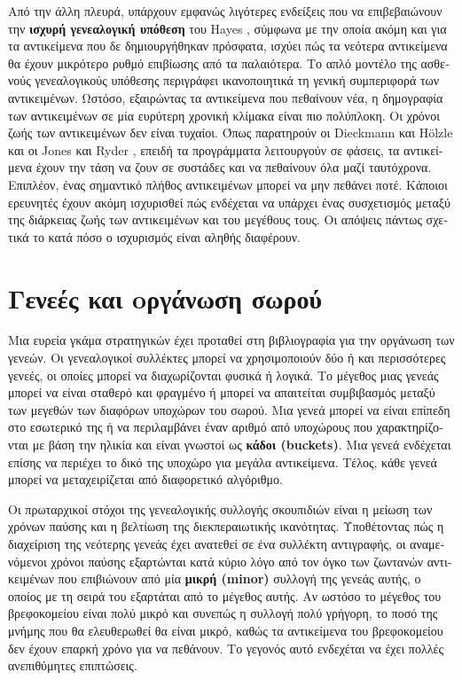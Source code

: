 \begin{greek}
Από την άλλη πλευρά, υπάρχουν εμφανώς λιγότερες ενδείξεις
που να επιβεβαιώνουν την \textbf{ισχυρή γενεαλογική υπόθεση}
του Hayes \cite{DBLP:conf/oopsla/Hayes91}, σύμφωνα με την
οποία ακόμη και για τα αντικείμενα που δε δημιουργήθηκαν
πρόσφατα, ισχύει πώς τα νεότερα αντικείμενα θα έχουν μικρότερο
ρυθμό επιβίωσης από τα παλαιότερα. Το απλό μοντέλο της ασθενούς
γενεαλογικούς υπόθεσης περιγράφει ικανοποιητικά τη γενική
συμπεριφορά των αντικειμένων. Ωστόσο, εξαιρώντας τα αντικείμενα
που πεθαίνουν νέα, η δημογραφία των αντικειμένων σε μία
ευρύτερη χρονική κλίμακα είναι πιο πολύπλοκη. Οι χρόνοι
ζωής των αντικειμένων δεν είναι τυχαίοι. Όπως παρατηρούν
οι Dieckmann και H{\"o}lzle \cite{DBLP:conf/ecoop/DieckmannH99}
και οι Jones και Ryder \cite{DBLP:conf/iwmm/JonesR08}, επειδή
τα προγράμματα λειτουργούν σε φάσεις, τα αντικείμενα έχουν
την τάση να ζουν σε συστάδες και να πεθαίνουν όλα μαζί
ταυτόχρονα. Επιπλέον, ένας σημαντικό πλήθος αντικειμένων μπορεί
να μην πεθάνει ποτέ. Κάποιοι ερευνητές έχουν ακόμη ισχυρισθεί
πώς ενδέχεται να υπάρχει ένας συσχετισμός μεταξύ της διάρκειας
ζωής των αντικειμένων και του μεγέθους τους. Οι απόψεις πάντως
\cite{DBLP:conf/oopsla/CaudillW86, DBLP:conf/oopsla/UngarJ88,
DBLP:conf/pldi/BarrettZ93} σχετικά το κατά πόσο ο ισχυρισμός
είναι αληθής διαφέρουν.

\section{Γενεές και oργάνωση σωρού}
Μια ευρεία γκάμα στρατηγικών έχει προταθεί στη βιβλιογραφία για την οργάνωση των
γενεών. Οι γενεαλογικοί συλλέκτες μπορεί να χρησιμοποιούν δύο ή και περισσότερες
γενεές, οι οποίες μπορεί να διαχωρίζονται φυσικά ή λογικά. Το μέγεθος μιας γενεάς
μπορεί να είναι σταθερό και φραγμένο ή μπορεί να απαιτείται συμβιβασμός μεταξύ των 
μεγεθών των διαφόρων υποχώρων του σωρού. Μια γενεά μπορεί να είναι επίπεδη στο
εσωτερικό της ή να περιλαμβάνει έναν αριθμό από υποχώρους που χαρακτηρίζονται
με βάση την ηλικία και είναι γνωστοί ως \textbf{κάδοι (buckets)}. Μια γενεά ενδέχεται
επίσης να περιέχει το δικό της υποχώρο για μεγάλα αντικείμενα. Τέλος, κάθε γενεά
μπορεί να μεταχειρίζεται από διαφορετικό αλγόριθμο.

Οι πρωταρχικοί στόχοι της γενεαλογικής συλλογής σκουπιδιών είναι η μείωση των
χρόνων παύσης και η βελτίωση της διεκπεραιωτικής ικανότητας. Υποθέτοντας πώς η
διαχείριση της νεότερης γενεάς έχει ανατεθεί σε ένα συλλέκτη αντιγραφής, οι αναμενόμενοι
χρόνοι παύσης εξαρτώνται κατά κύριο λόγο από τον όγκο των ζωντανών αντικειμένων
που επιβιώνουν από μία \textbf{μικρή (minor)} συλλογή της γενεάς αυτής, ο οποίος
με τη σειρά του εξαρτάται από το μέγεθος αυτής. Αν ωστόσο το μέγεθος του βρεφοκομείου
είναι πολύ μικρό και συνεπώς η συλλογή πολύ γρήγορη, το ποσό της μνήμης που θα 
ελευθερωθεί θα είναι μικρό, καθώς τα αντικείμενα του βρεφοκομείου δεν έχουν
επαρκή χρόνο για να πεθάνουν. Το γεγονός αυτό ενδεχέται να έχει πολλές ανεπιθύμητες
επιπτώσεις. 


\end{greek}
